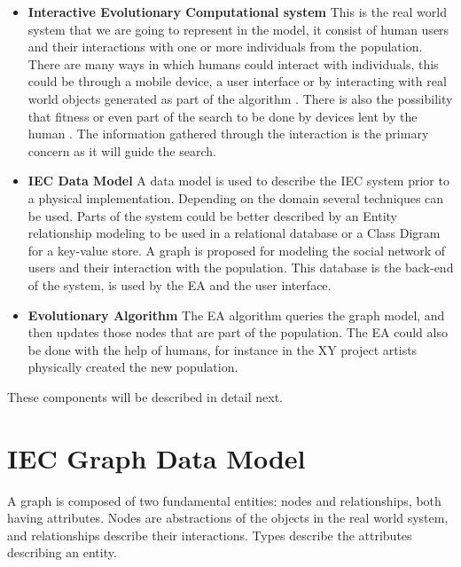 \documentclass[conference]{IEEEtran}
\begin{document}
\begin{itemize}
  \item {\bf Interactive Evolutionary Computational system} 
  This is the real world system that we are going to represent in the model, 
  it consist of human users and their interactions with one or more individuals
  from
  the population. There are many ways in which humans could interact 
  with individuals, this could be through a mobile device, a user interface 
  or by interacting with real world objects generated as part of the algorithm 
  \cite{de2014artists,de2013unplugging}. 
  There is also the possibility that fitness or even part of the search 
  to be done by devices lent by the human \cite{DBLP:conf/gecco/MereloCGCRV16}.
  The information gathered through the interaction is the primary concern
  as it will guide the search. 

  \item {\bf IEC Data Model}
  A data model is used to describe the IEC system prior to a physical 
  implementation. 
  Depending on the domain several techniques can be used.
  Parts of the system could be better described by an Entity relationship 
  modeling to be used in a relational database or a Class Digram for a 
  key-value store. 
  A graph is proposed for modeling the social network
  of users and their interaction with the population. This database 
  is the back-end of the system, is used by the EA and the user interface. 

  \item {\bf Evolutionary Algorithm} 
  The EA algorithm queries the graph model, and then updates those nodes that 
  are part of the population. The EA could also be done with the help of
  humans, for instance in the XY project \cite{de2013unplugging} artists physically created
  the new population.  
\end{itemize}

These components will be described in detail next.

\section{IEC Graph Data Model} 

A graph is composed of two fundamental entities: nodes and relationships,
both having attributes. Nodes are abstractions of the objects in the real 
world system, and relationships describe their interactions. Types describe
the attributes describing an entity.
\end{document}
